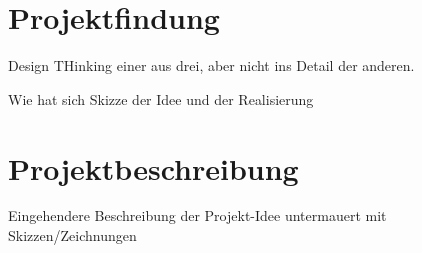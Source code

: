 \chapter{Projektfindung}

    Design THinking einer aus drei, aber nicht ins Detail der anderen.
    
    Wie hat sich Skizze der Idee und der Realisierung

\chapter{Projektbeschreibung}
    
    Eingehendere Beschreibung der Projekt-Idee untermauert mit
    Skizzen/Zeichnungen